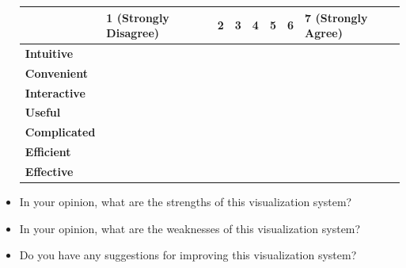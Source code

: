 \begin{itemize}
	\begin{center}
		\begin{tabular}{ | l | l | l | l | l | l | l | l | }
			\hline
			& 1 (Strongly Disagree) & 2 & 3 & 4 & 5 & 6 & 7 (Strongly Agree) \\ \hline
			\textbf{Intuitive}   &                       &   &   &   &   &   &                    \\ \hline
			\textbf{Convenient}  &                       &   &   &   &   &   &                    \\ \hline
			\textbf{Interactive} &                       &   &   &   &   &   &                    \\ \hline
			\textbf{Useful}      &                       &   &   &   &   &   &                    \\ \hline
			\textbf{Complicated} &                       &   &   &   &   &   &                    \\ \hline
			\textbf{Efficient}   &                       &   &   &   &   &   &                    \\ \hline
			\textbf{Effective}   &                       &   &   &   &   &   &                    \\ \hline
		\end{tabular}
	\end{center}
	\item In your opinion, what are the strengths of this visualization system?
	\item In your opinion, what are the weaknesses of this visualization system?
	\item Do you have any suggestions for improving this visualization system?
\end{itemize}

